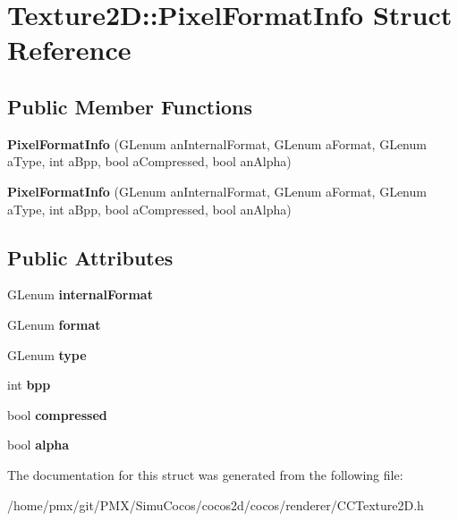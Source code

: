 \hypertarget{structTexture2D_1_1PixelFormatInfo}{}\section{Texture2D\+:\+:Pixel\+Format\+Info Struct Reference}
\label{structTexture2D_1_1PixelFormatInfo}
\subsection*{Public Member Functions}
\begin{DoxyCompactItemize}
\item 
\mbox{\label{structTexture2D_1_1PixelFormatInfo_ac15a564abbaf900472274eb23ca3c9ab}} 
{\bfseries Pixel\+Format\+Info} (G\+Lenum an\+Internal\+Format, G\+Lenum a\+Format, G\+Lenum a\+Type, int a\+Bpp, bool a\+Compressed, bool an\+Alpha)
\item 
\mbox{\label{structTexture2D_1_1PixelFormatInfo_ac15a564abbaf900472274eb23ca3c9ab}} 
{\bfseries Pixel\+Format\+Info} (G\+Lenum an\+Internal\+Format, G\+Lenum a\+Format, G\+Lenum a\+Type, int a\+Bpp, bool a\+Compressed, bool an\+Alpha)
\end{DoxyCompactItemize}
\subsection*{Public Attributes}
\begin{DoxyCompactItemize}
\item 
\mbox{\label{structTexture2D_1_1PixelFormatInfo_a6dc0d9f08e4e1ab83f489e531f36615e}} 
G\+Lenum {\bfseries internal\+Format}
\item 
\mbox{\label{structTexture2D_1_1PixelFormatInfo_aa8dcd80b81fda04a7ad2a84c31061498}} 
G\+Lenum {\bfseries format}
\item 
\mbox{\label{structTexture2D_1_1PixelFormatInfo_adc0dcf0f9ecdf0030be79eb78aaaf85c}} 
G\+Lenum {\bfseries type}
\item 
\mbox{\label{structTexture2D_1_1PixelFormatInfo_ab8b61f83944a3b82aa71c855bcf3b7db}} 
int {\bfseries bpp}
\item 
\mbox{\label{structTexture2D_1_1PixelFormatInfo_a5bf631623253d9f67448932430344292}} 
bool {\bfseries compressed}
\item 
\mbox{\label{structTexture2D_1_1PixelFormatInfo_aeb6d71b212a49c3bda9ac8442ba37352}} 
bool {\bfseries alpha}
\end{DoxyCompactItemize}


The documentation for this struct was generated from the following file\+:\begin{DoxyCompactItemize}
\item 
/home/pmx/git/\+P\+M\+X/\+Simu\+Cocos/cocos2d/cocos/renderer/C\+C\+Texture2\+D.\+h\end{DoxyCompactItemize}
